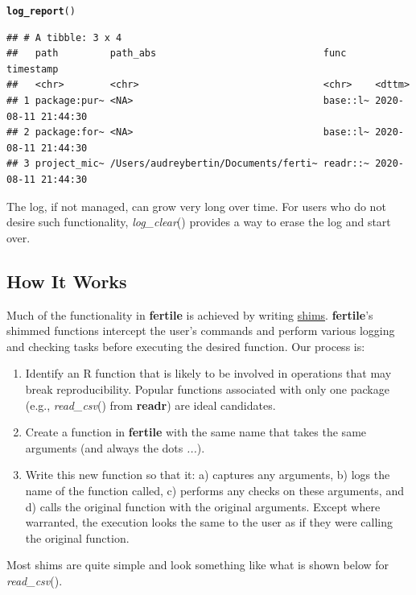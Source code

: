 \documentclass[APA,LATO1COL]{WileyNJD-v2}\usepackage[]{graphicx}\usepackage[]{color}
\makeatletter
\newcommand{\hlstd}[1]{\textcolor[rgb]{0.345,0.345,0.345}{#1}}%
\newcommand{\hlkwd}[1]{\textcolor[rgb]{0.737,0.353,0.396}{\textbf{#1}}}%
\newenvironment{kframe}{%
 \def\at@end@of@kframe{}%
 \ifinner\ifhmode%
  \def\at@end@of@kframe{\end{minipage}}%
  \begin{minipage}{\columnwidth}%
 \fi\fi%
 \def\FrameCommand##1{\hskip\@totalleftmargin \hskip-\fboxsep
 \colorbox{shadecolor}{##1}\hskip-\fboxsep
     \hskip-\linewidth \hskip-\@totalleftmargin \hskip\columnwidth}%
 \MakeFramed {\advance\hsize-\width
   \@totalleftmargin\z@ \linewidth\hsize
   \@setminipage}}%
 {\par\unskip\endMakeFramed%
 \at@end@of@kframe}
\newenvironment{knitrout}{}{} %
\newcommand{\R}{\textsf{R}\xspace}
\newcommand{\cmd}[1]{\textit{#1}}
\newcommand{\pkg}[1]{\textbf{#1}}
\newcommand{\func}[1]{\textit{#1}()}
\makeatother
\begin{document}
\begin{knitrout}
\color{fgcolor}\begin{kframe}
\begin{alltt}
\hlkwd{log_report}\hlstd{()}
\end{alltt}
\begin{verbatim}
## # A tibble: 3 x 4
##   path         path_abs                             func     timestamp          
##   <chr>        <chr>                                <chr>    <dttm>             
## 1 package:pur~ <NA>                                 base::l~ 2020-08-11 21:44:30
## 2 package:for~ <NA>                                 base::l~ 2020-08-11 21:44:30
## 3 project_mic~ /Users/audreybertin/Documents/ferti~ readr::~ 2020-08-11 21:44:30
\end{verbatim}
\end{kframe}
\end{knitrout}

The log, if not managed, can grow very long over time. For users who do not desire such functionality, \func{log\_clear} provides a way to erase the log and start over.




\subsection{How It Works}

Much of the functionality in \pkg{fertile} is achieved by writing \href{https://en.wikipedia.org/wiki/Shim_(computing)}{shims}. \pkg{fertile}'s shimmed functions intercept the user's commands and perform various logging and checking tasks before executing the desired function. Our process is:

\begin{enumerate}[noitemsep]
\item Identify an \R function that is likely to be involved in operations that may break reproducibility. Popular functions associated with only one package (e.g., \func{read\_csv} from \pkg{readr}) are ideal candidates.
\item Create a function in \pkg{fertile} with the same name that takes the same arguments (and always the dots \cmd{...}).
\item Write this new function so that it: a) captures any arguments, b) logs the name of the function called, c) performs any checks on these arguments, and d) calls the original function with the original arguments. Except where warranted, the execution looks the same to the user as if they were calling the original function.
\end{enumerate}
Most shims are quite simple and look something like what is shown below for \func{read\_csv}. 
\end{document}
